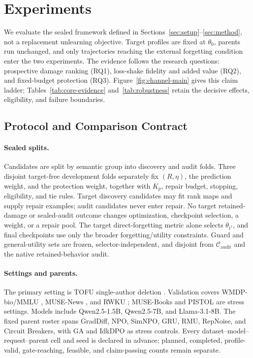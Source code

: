 
\section{Experiments}
\label{sec:experiments}

We evaluate the sealed framework defined in
Sections~\ref{sec:setup}--\ref{sec:method}, not a replacement unlearning
objective. Target profiles are fixed at $\theta_0$, parents run unchanged,
and only trajectories reaching the external forgetting condition enter the
two experiments. The evidence follows the research questions:
prospective damage ranking (RQ1), loss-shake fidelity and added value (RQ2),
and fixed-budget protection (RQ3). Figure~\ref{fig:channel-main} gives this
claim ladder; Tables~\ref{tab:core-evidence} and~\ref{tab:robustness} retain
the decisive effects, eligibility, and failure boundaries.



\subsection{Protocol and Comparison Contract}
\label{sec:benchmark-protocol}

\paragraph{Sealed splits.}
Candidates are split by semantic group into discovery and audit folds. Three
disjoint target-free development folds separately fix $(R,\eta)$, the
prediction weight, and the protection weight, together with $K_p$, repair
budget, stopping, eligibility, and tie rules. Target discovery candidates may
fit rank maps and supply repair examples; audit candidates never enter repair.
No target retained-damage or sealed-audit outcome changes optimization,
checkpoint selection, a weight, or a repair pool. The target direct-forgetting
metric alone selects $\theta_{t^\dagger}$, and final checkpoints use only the
broader forgetting/utility constraints. Guard and general-utility sets are
frozen, selector-independent, and disjoint from $\mathcal C_{\mathrm{audit}}$
and the native retained-behavior audit.

\paragraph{Settings and parents.}
The primary setting is TOFU single-author deletion
\cite{maini2024tofu}. Validation covers WMDP-bio/MMLU
\cite{li2024wmdp,hendrycks2021measuring}, MUSE-News
\cite{shi2024muse}, and RWKU \cite{jin2024rwku}; MUSE-Books and PISTOL
\cite{qiu2024pistol} are stress settings. Models include Qwen2.5-1.5B,
Qwen2.5-7B, and Llama-3.1-8B. The fixed parent roster spans GradDiff, NPO,
SimNPO, GRU, RMU, RepNoise, and Circuit Breakers, with GA and IdkDPO as stress
controls. Every dataset--model--request--parent cell and seed is declared in
advance; planned, completed, profile-valid, gate-reaching, feasible, and
claim-passing counts remain separate.

